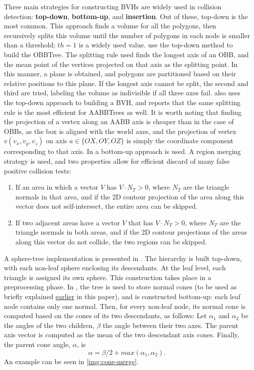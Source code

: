 Three main strategies for constructing BVHs are widely used in collision detection: \textbf{top-down}, \textbf{bottom-up}, and \textbf{insertion}. Out of these, top-down is the most common. This approach finds a volume for all the polygons, then recursively splits this volume until the number of polygons in each node is smaller than a threshold; $th = 1$ is a widely used value. \citep{gott96} use the top-down method to build the OBBTree. The splitting rule used finds the longest axis of an OBB, and the mean point of the vertices projected on that axis as the splitting point. In this manner, a plane is obtained, and polygons are partitioned based on their relative positions to this plane. If the longest axis cannot be split, the second and third are tried, labeling the volume as indivisible if all three axes fail. \citep{vdb97} also uses the top-down approach to building a BVH, and reports that the same splitting rule is the most efficient for AABBTrees as well. It is worth noting that finding the projection of a vertex along an AABB axis is cheaper than in the case of OBBs, as the box is aligned with the world axes, and the projection of vertex $v(v_{x}, v_{y}, v_{z})$ on axis $a \in \{OX, OY, OZ\}$ is simply the coordinate component corresponding to that axis. In \citep{vmt95} a bottom-up approach is used. A region merging strategy is used, and two properties allow for efficient discard of many false positive collision tests:

\begin{enumerate}
	\item \label{prop:sc1} If an area in which a vector $V$ has $V \cdot N_{T} > 0$, where $N_{T}$ are the triangle normals in that area, and if the 2D contour projection of the area along this vector does not self-intersect, the entire area can be skipped.

	\item \label{prop:sc2} If two adjacent areas have a vector $V$ that has $V \cdot N_{T} > 0$, where $N_{T}$ are the triangle normals in both areas, and if the 2D contour projections of the areas along this vector do not collide, the two regions can be skipped.
\end{enumerate}

A sphere-tree implementation is presented in \citep{rtsd01}. The hierarchy is built top-down, with each non-leaf sphere enclosing its descendants. At the leaf level, each triangle is assigned its own sphere. This construction takes place in a preprocessing phase. In \citep{provot97}, the tree is used to store normal cones (to be used as briefly explained \hyperref[lab:ncones]{earlier}  in this paper), and is constructed bottom-up: each leaf node contains only one normal. Then, for every non-leaf node, its normal cone is computed based on the cones of its two descendants, as follows: Let $\alpha_{1}$ and $\alpha_{2}$ be the angles of the two children, $\beta$ the angle between their two axes. The parent axis vector is computed as the mean of the two descendant axis cones. Finally, the parent cone angle, $\alpha$, is \[\alpha = \beta / 2 + max(\alpha_{1}, \alpha_{2}).\] An example can be seen in \autoref{img:cone-merge}.

